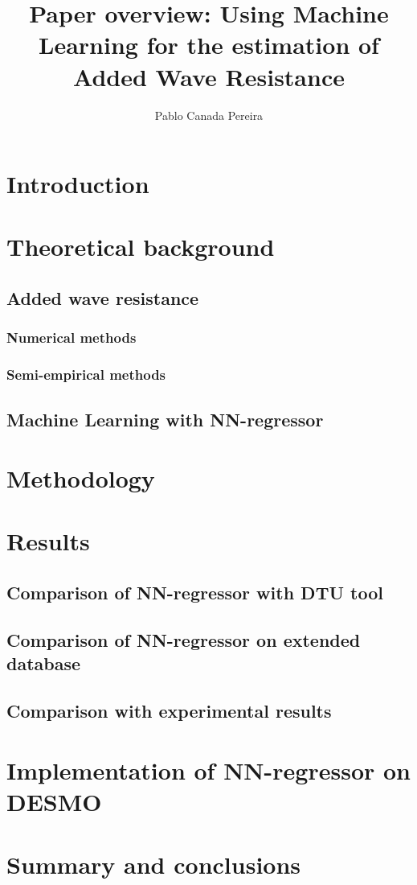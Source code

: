 \documentclass[5pt, twocolumn]{article}
\title{Paper overview: Using Machine Learning for the estimation of Added Wave Resistance }
\author{Pablo Canada Pereira}
\begin{document}
\maketitle

\section{Introduction}
\section{Theoretical background}
\subsection{Added wave resistance}
\subsubsection{Numerical methods}
\subsubsection{Semi-empirical methods}
\subsection{Machine Learning with NN-regressor}
\section{Methodology}
\section{Results}
\subsection{Comparison of NN-regressor with DTU tool}
\subsection{Comparison of NN-regressor on extended database}
\subsection{Comparison with experimental results}
\section{Implementation of NN-regressor on DESMO}
\section{Summary and conclusions}
\end{document}

